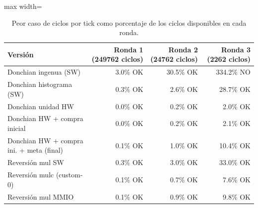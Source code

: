 \begin{table}[htbp]
\centering
\small
\begin{adjustbox}{max width=\linewidth}
\begin{tabular}{lrrr}
\toprule
Versión & Ronda 1 (249762 ciclos) & Ronda 2 (24762 ciclos) & Ronda 3 (2262 ciclos) \\
\midrule
Donchian ingenua (SW) & 3.0\% OK & 30.5\% OK & 334.2\% NO \\
Donchian histograma (SW) & 0.3\% OK & 2.6\% OK & 28.7\% OK \\
Donchian unidad HW & 0.0\% OK & 0.2\% OK & 2.0\% OK \\
Donchian HW + compra inicial & 0.0\% OK & 0.2\% OK & 2.1\% OK \\
Donchian HW + compra ini. + meta (final) & 0.1\% OK & 1.0\% OK & 10.4\% OK \\
Reversión mul SW & 0.3\% OK & 3.0\% OK & 33.0\% OK \\
Reversión mulc (custom-0) & 0.1\% OK & 0.7\% OK & 7.6\% OK \\
Reversión mul MMIO & 0.1\% OK & 0.9\% OK & 9.8\% OK \\
\bottomrule
\end{tabular}
\end{adjustbox}
\caption{Peor caso de ciclos por tick como porcentaje de los ciclos disponibles en cada ronda.}
\end{table}
